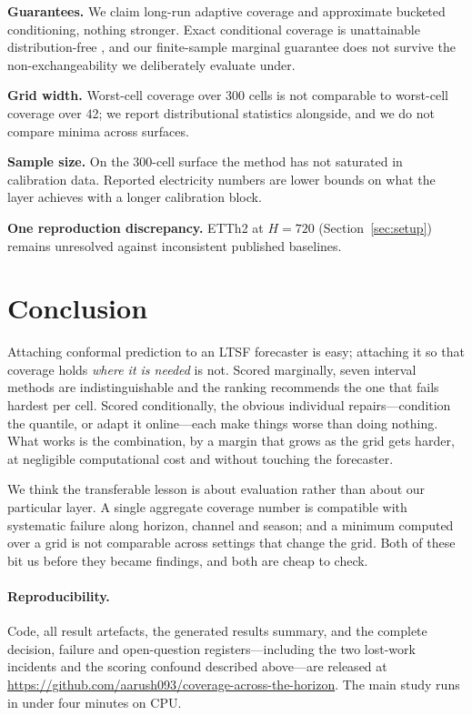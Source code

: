 \documentclass[11pt]{article}
\begin{document}
\textbf{Guarantees.} We claim long-run adaptive coverage and approximate bucketed conditioning, nothing stronger. Exact conditional coverage is unattainable distribution-free \citep{gcc}, and our finite-sample marginal guarantee does not survive the non-exchangeability we deliberately evaluate under.

\textbf{Grid width.} Worst-cell coverage over 300 cells is not comparable to worst-cell coverage over 42; we report distributional statistics alongside, and we do not compare minima across surfaces.

\textbf{Sample size.} On the 300-cell surface the method has not saturated in calibration data. Reported electricity numbers are lower bounds on what the layer achieves with a longer calibration block.

\textbf{One reproduction discrepancy.} ETTh2 at $H=720$ (Section~\ref{sec:setup}) remains unresolved against inconsistent published baselines.

\section{Conclusion}

Attaching conformal prediction to an LTSF forecaster is easy; attaching it so that coverage holds \emph{where it is needed} is not. Scored marginally, seven interval methods are indistinguishable and the ranking recommends the one that fails hardest per cell. Scored conditionally, the obvious individual repairs---condition the quantile, or adapt it online---each make things worse than doing nothing. What works is the combination, by a margin that grows as the grid gets harder, at negligible computational cost and without touching the forecaster.

We think the transferable lesson is about evaluation rather than about our particular layer. A single aggregate coverage number is compatible with systematic failure along horizon, channel and season; and a minimum computed over a grid is not comparable across settings that change the grid. Both of these bit us before they became findings, and both are cheap to check.

\paragraph{Reproducibility.} Code, all result artefacts, the generated results summary, and the complete decision, failure and open-question registers---including the two lost-work incidents and the scoring confound described above---are released at \url{https://github.com/aarush093/coverage-across-the-horizon}. The main study runs in under four minutes on CPU.
\end{document}

